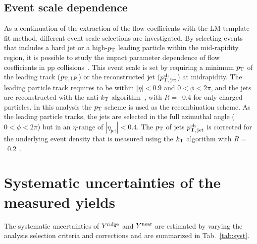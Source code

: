 \subsection{Event scale dependence}
As a continuation of the extraction of the flow coefficients with the LM-template fit method, different event scale selections are investigated. By selecting events that includes a hard jet or a high-$p_\mathrm{T}$ leading particle within the mid-rapidity region, it is possible to study the impact parameter dependence of flow coefficients in pp collisions~\cite{Sjostrand:1986ep,Frankfurt:2010ea}. This event scale is set by requiring a minimum $p_\mathrm{T}$ of the leading track ($p_\mathrm{T,\,LP}$) or the reconstructed jet ($p_\mathrm{T,\,jet}^\mathrm{ch}$) at midrapidity. The leading particle track requires to be within $|\eta|<0.9$ and $0<\phi<2\pi$, and the jets are reconstructed with the anti-$k_{\rm{T}}$ algorithm~\cite{Cacciari:2008gp,Cacciari:2011ma}, with $R=$~0.4 for only charged particles. In this analysis the $p_\mathrm{T}$ scheme is used as the recombination scheme. As the leading particle tracks, the jets are selected in the full azimuthal angle ($0<\phi<2\pi$) but in an $\eta$-range of $|\eta_\mathrm{jet}|<0.4$. The $p_\mathrm{T}$ of jets $p_\mathrm{T,\,jet}^\mathrm{ch}$ is corrected for the underlying event density that is measured using the $k_{\rm{T}}$ algorithm with $R=$~0.2~\cite{Acharya:2018eat}.





\section{Systematic uncertainties of the measured yields}
\label{sec:uncertainties}

The systematic uncertainties of $Y^{\rm{ridge}}$ and $Y^{\rm{near}}$ are estimated by varying the analysis selection criteria and corrections and are summarized in Tab.~\ref{tab:syst}.

